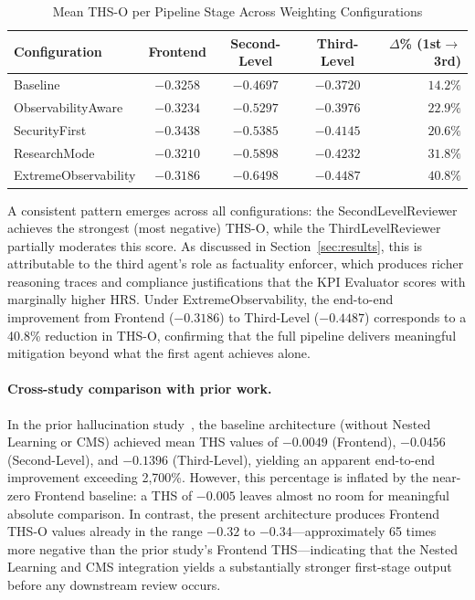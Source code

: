 \documentclass[11pt,a4paper]{article}
\begin{document}
\begin{table}[!htbp]
	\centering
	\caption{Mean THS-O per Pipeline Stage Across Weighting Configurations}
	\label{tab:ths_per_stage}
	\begin{tabular}{lcccr}
		\toprule
		\textbf{Configuration} & \textbf{Frontend} & \textbf{Second-Level} & \textbf{Third-Level} & \textbf{$\Delta$\% (1st$\to$3rd)} \\
		\midrule
		Baseline              & $-0.3258$ & $-0.4697$ & $-0.3720$ & $14.2\%$ \\
		ObservabilityAware    & $-0.3234$ & $-0.5297$ & $-0.3976$ & $22.9\%$ \\
		SecurityFirst         & $-0.3438$ & $-0.5385$ & $-0.4145$ & $20.6\%$ \\
		ResearchMode          & $-0.3210$ & $-0.5898$ & $-0.4232$ & $31.8\%$ \\
		ExtremeObservability  & $-0.3186$ & $-0.6498$ & $-0.4487$ & $40.8\%$ \\
		\bottomrule
	\end{tabular}
\end{table}

A consistent pattern emerges across all configurations: the SecondLevelReviewer achieves the strongest (most negative) THS-O, while the ThirdLevelReviewer partially moderates this score. As discussed in Section~\ref{sec:results}, this is attributable to the third agent's role as factuality enforcer, which produces richer reasoning traces and compliance justifications that the KPI Evaluator scores with marginally higher HRS. Under ExtremeObservability, the end-to-end improvement from Frontend ($-0.3186$) to Third-Level ($-0.4487$) corresponds to a 40.8\% reduction in THS-O, confirming that the full pipeline delivers meaningful mitigation beyond what the first agent achieves alone.

\paragraph{Cross-study comparison with prior work.}
In the prior hallucination study~\cite{gosmar2025hallucination}, the baseline architecture (without Nested Learning or CMS) achieved mean THS values of $-0.0049$ (Frontend), $-0.0456$ (Second-Level), and $-0.1396$ (Third-Level), yielding an apparent end-to-end improvement exceeding 2{,}700\%. However, this percentage is inflated by the near-zero Frontend baseline: a THS of $-0.005$ leaves almost no room for meaningful absolute comparison. In contrast, the present architecture produces Frontend THS-O values already in the range $-0.32$ to $-0.34$---approximately 65 times more negative than the prior study's Frontend THS---indicating that the Nested Learning and CMS integration yields a substantially stronger first-stage output before any downstream review occurs.
\end{document}
